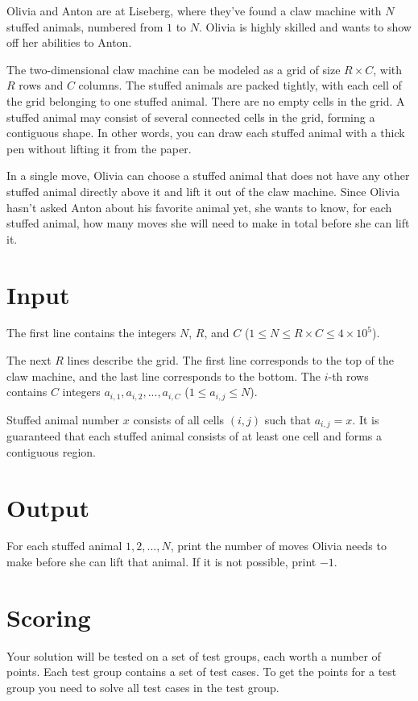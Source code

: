 Olivia and Anton are at Liseberg, 
where they've found a claw machine with $N$ stuffed animals, 
numbered from $1$ to $N$. 
Olivia is highly skilled and wants to show off her abilities to Anton. 

The two-dimensional claw machine can be modeled as a grid of size $R \times C$, 
with $R$ rows and $C$ columns. 
The stuffed animals are packed tightly, 
with each cell of the grid belonging to one stuffed animal. 
There are no empty cells in the grid.
A stuffed animal may consist of several connected cells in the grid, 
forming a contiguous shape. 
In other words, you can draw each stuffed animal with a thick pen without lifting it from the paper.

In a single move, 
Olivia can choose a stuffed animal that does not have any other stuffed animal directly above it and
lift it out of the claw machine. 
Since Olivia hasn't asked Anton about his favorite animal yet, 
she wants to know, for each stuffed animal, 
how many moves she will need to make in total before she can lift it.

\section*{Input}
The first line contains the integers $N$, $R$, and $C$ ($1 \leq N \leq R \times C \leq 4 \times 10^5$).

The next $R$ lines describe the grid.
The first line corresponds to the top of the claw machine,
and the last line corresponds to the bottom.
The $i$-th rows contains $C$ integers $a_{i,1}, a_{i,2}, ..., a_{i,C}$ ($1 \leq a_{i,j} \leq N$).

Stuffed animal number $x$ consists of all cells $(i, j)$ such that $a_{i,j} = x$.
It is guaranteed that each stuffed animal consists of at least one cell and forms a contiguous region.

\section*{Output}
For each stuffed animal $1, 2, ..., N$, 
print the number of moves Olivia needs to make before she can lift that animal. 
If it is not possible, print $-1$.

\section*{Scoring}
Your solution will be tested on a set of test groups, each worth a number of points. Each test group contains
a set of test cases. To get the points for a test group you need to solve all test cases in the test group.

